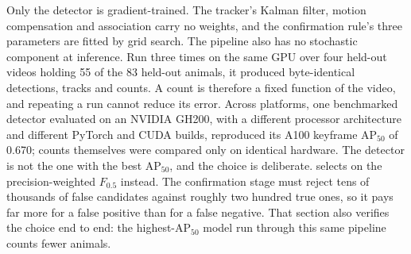 Only the detector is gradient-trained. The tracker's Kalman filter, motion compensation and
association carry no weights, and the confirmation rule's three parameters are fitted by
grid search. The pipeline also has no stochastic component at inference. Run three times on
the same GPU over four held-out videos holding 55 of the 83 held-out animals, it produced
byte-identical detections, tracks and counts. A count is therefore a fixed function of the
video, and repeating a run cannot reduce its error. Across platforms, one benchmarked
detector evaluated on an NVIDIA GH200, with a different processor architecture and different
PyTorch and CUDA builds, reproduced its A100 keyframe AP$_{50}$ of 0.670; counts themselves
were compared only on identical hardware. The detector is not the one with the best
AP$_{50}$, and the choice is deliberate.  selects on the
precision-weighted $F_{0.5}$ instead. The confirmation stage must reject tens of thousands
of false candidates against roughly two hundred true ones, so it pays far more for a false
positive than for a false negative. That section also verifies the choice end to end: the
highest-AP$_{50}$ model run through this same pipeline counts fewer animals.

